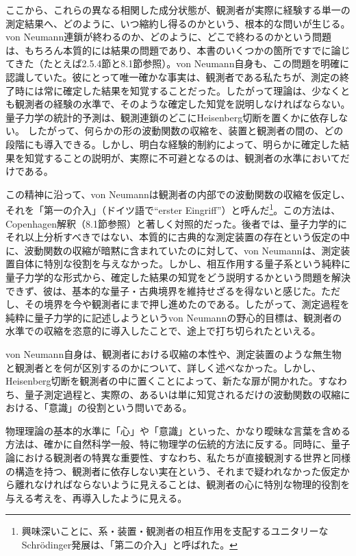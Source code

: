 ここから、これらの異なる相関した成分状態が、観測者が実際に経験する単一の測定結果へ、どのように、いつ縮約し得るのかという、根本的な問いが生じる。von Neumann連鎖が終わるのか、どのように、どこで終わるのかという問題は、もちろん本質的には結果の問題であり、本書のいくつかの箇所ですでに論じてきた（たとえば2.5.4節と8.1節参照）。von Neumann自身も、この問題を明確に認識していた。彼にとって唯一確かな事実は、観測者である私たちが、測定の終了時には常に確定した結果を知覚することだった。したがって理論は、少なくとも観測者の経験の水準で、そのような確定した知覚を説明しなければならない。量子力学の統計的予測は、観測連鎖のどこにHeisenberg切断を置くかに依存しない。
\hypertarget{srcpage:363}{}\label{srcpage:363}
したがって、何らかの形の波動関数の収縮を、装置と観測者の間の、どの段階にも導入できる。しかし、明白な経験的制約によって、明らかに確定した結果を知覚することの説明が、実際に不可避となるのは、観測者の水準においてだけである。

この精神に沿って、von Neumannは観測者の内部での波動関数の収縮を仮定し、それを「第一の介入」（ドイツ語で``erster Eingriff''）と呼んだ\footnote{興味深いことに、系・装置・観測者の相互作用を支配するユニタリーなSchrödinger発展は、「第二の介入」と呼ばれた。}。この方法は、Copenhagen解釈（8.1節参照）と著しく対照的だった。後者では、量子力学的にそれ以上分析すべきではない、本質的に古典的な測定装置の存在という仮定の中に、波動関数の収縮が暗黙に含まれていたのに対して、von Neumannは、測定装置自体に特別な役割を与えなかった。しかし、相互作用する量子系という純粋に量子力学的な形式から、確定した結果の知覚をどう説明するかという問題を解決できず、彼は、基本的な量子・古典境界を維持せざるを得ないと感じた。ただし、その境界を今や観測者にまで押し進めたのである。したがって、測定過程を純粋に量子力学的に記述しようというvon Neumannの野心的目標は、観測者の水準での収縮を恣意的に導入したことで、途上で打ち切られたといえる。

von Neumann自身は、観測者における収縮の本性や、測定装置のような無生物と観測者とを何が区別するのかについて、詳しく述べなかった。しかし、Heisenberg切断を観測者の中に置くことによって、新たな扉が開かれた。すなわち、量子測定過程と、実際の、あるいは単に知覚されるだけの波動関数の収縮における、「意識」の役割という問いである。

物理理論の基本的水準に「心」や「意識」といった、かなり曖昧な言葉を含める方法は、確かに自然科学一般、特に物理学の伝統的方法に反する。同時に、量子論における観測者の特異な重要性、すなわち、私たちが直接観測する世界と同様の構造を持つ、観測者に依存しない実在という、それまで疑われなかった仮定から離れなければならないように見えることは、観測者の心に特別な物理的役割を与える考えを、再導入したように見える。

